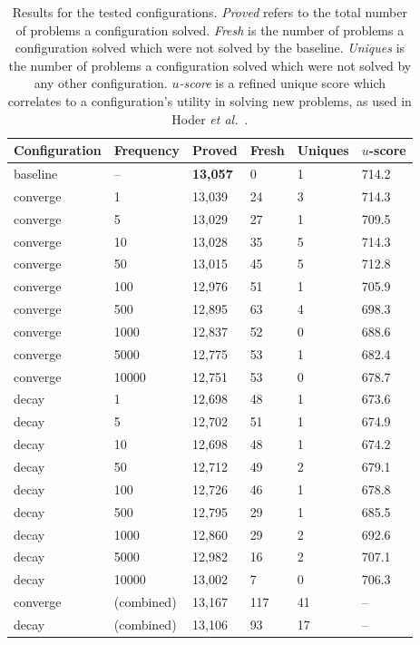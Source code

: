 \documentclass{llncs}
\begin{document}
\begin{table}[t]
	\caption{
Results for the tested configurations.
\emph{Proved} refers to the total number of problems a configuration solved.
\emph{Fresh} is the number of problems a configuration solved which were not solved by the baseline.
\emph{Uniques} is the number of problems a configuration solved which were not solved by any other configuration.
\emph{\(u\)-score} is a refined unique score which correlates to a configuration's utility in solving new problems, as used in Hoder \emph{et al.}~\cite{u-score}.
	}
	\centering
	\begin{tabular}{l l l l l l}
		Configuration & Frequency & Proved & Fresh & Uniques & \(u\)-score\\
		\hline
		baseline & -- & \textbf{13,057} & 0 & 1 & 714.2\\ \hline
		converge & 1 & 13,039 & 24 & 3 & 714.3\\
		converge & 5 & 13,029 & 27 & 1 & 709.5\\
		converge & 10 & 13,028 & 35 & 5 & 714.3\\
		converge & 50 & 13,015 & 45 & 5 & 712.8\\
		converge & 100 & 12,976 & 51 & 1 & 705.9\\
		converge & 500 & 12,895 & 63 & 4 & 698.3\\
		converge & 1000 & 12,837 & 52 & 0 & 688.6\\
		converge & 5000 & 12,775 & 53 & 1 & 682.4\\
		converge & 10000 & 12,751 & 53 & 0 & 678.7\\ \hline
		decay & 1 & 12,698 & 48 & 1 & 673.6\\
		decay & 5 & 12,702 & 51 & 1 & 674.9\\
		decay & 10 & 12,698 & 48 & 1 & 674.2\\
		decay & 50 & 12,712 & 49 & 2 & 679.1\\
		decay & 100 & 12,726 & 46 & 1 & 678.8\\
		decay & 500 & 12,795 & 29 & 1 & 685.5\\
		decay & 1000 & 12,860 & 29 & 2 & 692.6\\
		decay & 5000 & 12,982 & 16 & 2 & 707.1\\
		decay & 10000 & 13,002 & 7 & 0 & 706.3\\
		\hline
		converge & (combined) & 13,167 & 117 & 41 & --\\
		decay & (combined) & 13,106 & 93 & 17 & --\\
	\end{tabular}
	\label{tab:results}
\end{table}
\end{document}
